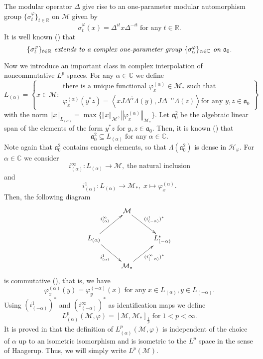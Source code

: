 \documentclass[10pt]{amsart}
\numberwithin{thm}{section}
\numberwithin{equation}{section}
\begin{document}
The modular operator $\Delta$ give rise to an one-parameter modular automorphism group $\{\sigma^\varphi_t\}_{t\in\mathbb{R}}$ on ${\mathcal{M}}$ given by
	$$\sigma^\varphi_t(x) = \Delta^{it}x\Delta^{-it}\; \text{for any}\; t\in \mathbb{R}.$$
It is well known (\cite{Ta03}) that 
	\begin{equation}\label{analytic-elts}
	\text{{\it$\{\sigma^\varphi_t\}_{t\in\mathbb{R}}$ extends to a complex one-parameter group
	$\{\sigma^\varphi_\alpha\}_{\alpha \in \mathbb{C}}$ on $\mathfrak{a}_0$.}}
	\end{equation}

Now we introduce an important class in complex interpolation of noncommutative $L^p$ spaces. For any $\alpha \in \mathbb{C}$ we define
	\begin{equation}\label{def-L-alpha}
	L_{(\alpha)} = \left\{ x\in {\mathcal{M}}:  \begin{array}{ll} \text{there is a unique functional $\varphi^{(\alpha)}_x \in {\mathcal{M}}_*$ such that}\\
	\text{$\varphi^{(\alpha)}_x(y^* z) = \left\langle xJ\Delta^{\overline{\alpha}} \Lambda (y), J\Delta^{-\alpha} \Lambda(z) \right\rangle$
	for any $y,z\in \mathfrak{a}_0$}  \end{array}\right\}
	\end{equation}
with the norm ${\left\Vert{x}\right\Vert}_{L_{(\alpha)}} = \max\{ {\left\Vert{x}\right\Vert}_{\mathcal{M}}, {\left\Vert{\varphi^{(\alpha)}_x}\right\Vert}_{{\mathcal{M}}_*} \}$.
Let $\mathfrak{a}^2_0$ be the algebraic linear span of the elements of the form $y^*z$ for $y,z \in \mathfrak{a}_0$.
Then, it is known (\cite{Iz97}) that
	$$\mathfrak{a}^2_0 \subseteq L_{(\alpha)}\; \text{for any}\; \alpha \in \mathbb{C}.$$
Note again that $\mathfrak{a}^2_0$ contains enough elements, so that $\Lambda(\mathfrak{a}^2_0)$ is dense in ${\mathcal{H}}_\varphi$.
For $\alpha \in \mathbb{C}$ we consider
	$$i^\infty_{(\alpha)} : L_{(\alpha)} \rightarrow {\mathcal{M}},\; \text{the natural inclusion}$$
and
	$$i^1_{(\alpha)} : L_{(\alpha)} \rightarrow {\mathcal{M}}_*,\; x\mapsto \varphi^{(\alpha)}_x.$$ 
Then, the following diagram
	\begin{equation}\label{diagram-interpol}
	\xymatrix{&{\mathcal{M}} \ar[dr]^{(i^1_{(-\alpha)})^*} & \\L_{(\alpha)} \ar[ur]^{i^\infty_{(\alpha)}} \ar[dr]_{i^1_{(\alpha)}} && L^*_{(-\alpha)}\\
	&{\mathcal{M}}_* \ar[ur]_{(i^\infty_{(-\alpha)})^*}&}
	\end{equation}
is commutative (\cite[Theorem 2.5]{Iz97}), that is, we have
	$$\varphi^{(\alpha)}_x (y) = \varphi^{(-\alpha)}_y(x)\; \text{for any}\; x\in L_{(\alpha)}, y\in L_{(-\alpha)}.$$
Using $(i^1_{(-\alpha)})^*$ and $(i^\infty_{(-\alpha)})^*$ as identification maps we define
	$$L^p_{(\alpha)}({\mathcal{M}}, \varphi) = [{\mathcal{M}}, {\mathcal{M}}_*]_{\frac{1}{p}}\; \text{for}\; 1<p<\infty.$$
It is proved in \cite{Iz97} that the definition of $L^p_{(\alpha)}({\mathcal{M}}, \varphi)$ is independent of the choice of $\alpha$
up to an isometric isomorphism and is isometric to the $L^p$ space in the sense of Haagerup. Thus, we will simply write $L^p({\mathcal{M}})$.
\end{document}

